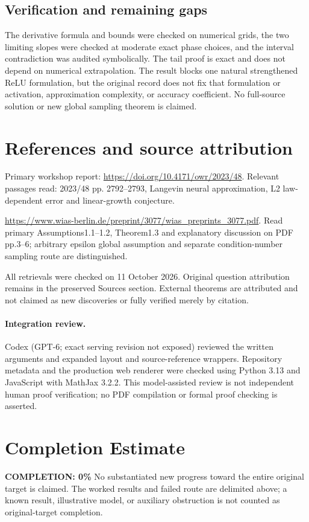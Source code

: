 \documentclass[11pt]{article}
\begin{document}
\subsection{Verification and remaining gaps}
The derivative formula and bounds were checked on numerical grids, the two limiting slopes were checked at moderate exact phase choices, and the interval contradiction was audited symbolically. The tail proof is exact and does not depend on numerical extrapolation. The result blocks one natural strengthened ReLU formulation, but the original record does not fix that formulation or activation, approximation complexity, or accuracy coefficient. No full-source solution or new global sampling theorem is claimed.

\section{References and source attribution}
Primary workshop report: \url{https://doi.org/10.4171/owr/2023/48}. Relevant passages read: 2023/48 pp. 2792--2793, Langevin neural approximation, L2 law-dependent error and linear-growth conjecture.

\url{https://www.wias-berlin.de/preprint/3077/wias_preprints_3077.pdf}. Read primary Assumptions1.1--1.2, Theorem1.3 and explanatory discussion on PDF pp.3--6; arbitrary epsilon global assumption and separate condition-number sampling route are distinguished.

All retrievals were checked on 11 October 2026. Original question attribution remains in the preserved Sources section. External theorems are attributed and not claimed as new discoveries or fully verified merely by citation.


\paragraph{Integration review.} Codex (GPT-6; exact serving revision not exposed) reviewed the written arguments and expanded layout and source-reference wrappers. Repository metadata and the production web renderer were checked using Python 3.13 and JavaScript with MathJax 3.2.2. This model-assisted review is not independent human proof verification; no PDF compilation or formal proof checking is asserted.

\section{Completion Estimate}
\noindent\textbf{COMPLETION: 0\%}
No substantiated new progress toward the entire original target is claimed. The worked results and failed route are delimited above; a known result, illustrative model, or auxiliary obstruction is not counted as original-target completion.
\end{document}
